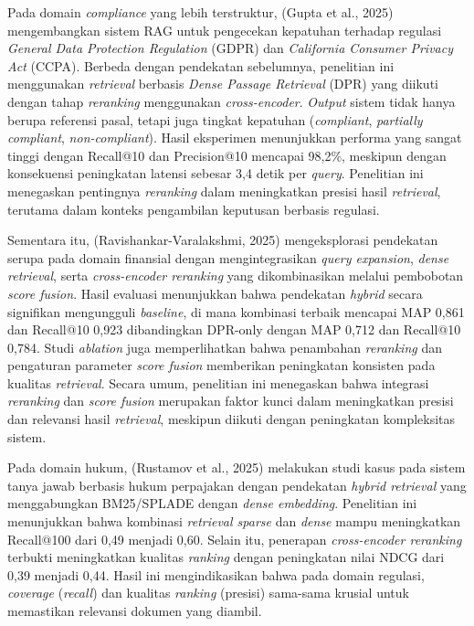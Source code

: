 Pada domain \textit{compliance} yang lebih terstruktur, (Gupta et al., 2025) mengembangkan sistem RAG untuk pengecekan kepatuhan terhadap regulasi \textit{General Data Protection Regulation} (GDPR) dan \textit{California Consumer Privacy Act} (CCPA). Berbeda dengan pendekatan sebelumnya, penelitian ini menggunakan \textit{retrieval} berbasis \textit{Dense Passage Retrieval} (DPR) yang diikuti dengan tahap \textit{reranking} menggunakan \textit{cross-encoder}. \textit{Output} sistem tidak hanya berupa referensi pasal, tetapi juga tingkat kepatuhan (\textit{compliant}, \textit{partially compliant}, \textit{non-compliant}). Hasil eksperimen menunjukkan performa yang sangat tinggi dengan Recall@10 dan Precision@10 mencapai 98,2\%, meskipun dengan konsekuensi peningkatan latensi sebesar 3,4 detik per \textit{query}. Penelitian ini menegaskan pentingnya \textit{reranking} dalam meningkatkan presisi hasil \textit{retrieval}, terutama dalam konteks pengambilan keputusan berbasis regulasi.

Sementara itu, (Ravishankar-Varalakshmi, 2025) mengeksplorasi pendekatan serupa pada domain finansial dengan mengintegrasikan \textit{query expansion}, \textit{dense retrieval}, serta \textit{cross-encoder reranking} yang dikombinasikan melalui pembobotan \textit{score fusion}. Hasil evaluasi menunjukkan bahwa pendekatan \textit{hybrid} secara signifikan mengungguli \textit{baseline}, di mana kombinasi terbaik mencapai MAP 0,861 dan Recall@10 0,923 dibandingkan DPR-only dengan MAP 0,712 dan Recall@10 0,784. Studi \textit{ablation} juga memperlihatkan bahwa penambahan \textit{reranking} dan pengaturan parameter \textit{score fusion} memberikan peningkatan konsisten pada kualitas \textit{retrieval}. Secara umum, penelitian ini menegaskan bahwa integrasi \textit{reranking} dan \textit{score fusion} merupakan faktor kunci dalam meningkatkan presisi dan relevansi hasil \textit{retrieval}, meskipun diikuti dengan peningkatan kompleksitas sistem.

Pada domain hukum, (Rustamov et al., 2025) melakukan studi kasus pada sistem tanya jawab berbasis hukum perpajakan dengan pendekatan \textit{hybrid retrieval} yang menggabungkan BM25/SPLADE dengan \textit{dense embedding}. Penelitian ini menunjukkan bahwa kombinasi \textit{retrieval sparse} dan \textit{dense} mampu meningkatkan Recall@100 dari 0,49 menjadi 0,60. Selain itu, penerapan \textit{cross-encoder reranking} terbukti meningkatkan kualitas \textit{ranking} dengan peningkatan nilai NDCG dari 0,39 menjadi 0,44. Hasil ini mengindikasikan bahwa pada domain regulasi, \textit{coverage} (\textit{recall}) dan kualitas \textit{ranking} (presisi) sama-sama krusial untuk memastikan relevansi dokumen yang diambil.

